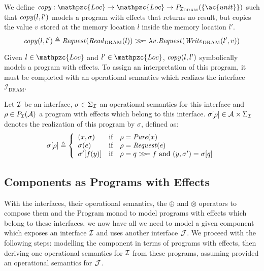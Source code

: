 \begin{example}[Copy]
  We define
  $\func{copy} : \mathpzc{Loc} \rightarrow \mathpzc{Loc} \rightarrow
  P_{\I_{\mathrm{DRAM}}}(\{\ac{unit}\})$ such that $\mathit{copy}(l, l')$ models a
  program with effects that returns no result, but copies the value $v$ stored
  at the memory location $l$ inside the memory location $l'$.
  \[ \mathit{copy}(l, l') \triangleq
    \mathit{Request}(\mathit{Read}_{\mathrm{DRAM}}(l)) >\!\!>\!\!= \lambda
    v. \mathit{Request}(\mathit{Write}_{\mathrm{DRAM}}(l', v))
  \]
\end{example}

Given $l \in \mathpzc{Loc}$ and $l' \in \mathpzc{Loc}$, $\mathit{copy}(l, l')$
symbolically models a program with effects.
%
To assign an interpretation of this program, it must be completed with an
operational semantics which realizes the interface
$\mathcal{I}_{\mathrm{DRAM}}$.

\begin{definition} \label{def:freespec:realisation} Let $\mathcal{I}$ be an interface,
  $\sigma \in \Sigma_{\mathcal{I}}$ an operational semantics for this interface and
  $\rho \in P_{\mathcal{I}}(\mathcal{A})$ a program with effects which belong to this
  interface.
  $\sigma[\rho] \in \mathcal{A} \times \Sigma_{\mathcal{I}}$ denotes the realization of
  this program by $\sigma$, defined as:
  \[ \sigma[\rho] \triangleq \left\{
      \begin{array}{lcl} (x, \sigma) & \text{if} & \rho =
                                                   \mathit{Pure}(x) \\
        \sigma(e) & \text{if} & \rho =
                                \mathit{Request}(e) \\
        \sigma'[f(y)] & \text{if} & \rho =
                                    q >\!\!>\!\!= f\text{ and }(y, \sigma') = \sigma[q] \\
      \end{array}
    \right.
  \]
\end{definition}

\subsection{Components as Programs with Effects}

With the interfaces, their operational semantics, the $\oplus$ and $\otimes$
operators to compose them and the Program monad to model programs with effects
which belong to these interfaces, we now have all we need to model a given
component which exposes an interface $\mathcal{I}$ and uses another interface $\mathcal{J}$.
%
We proceed with the following steps: modelling the component in terms of
programs with effects, then deriving one operational semantics for $\mathcal{I}$ from
these programs, assuming provided an operational semantics for $\mathcal{J}$.

